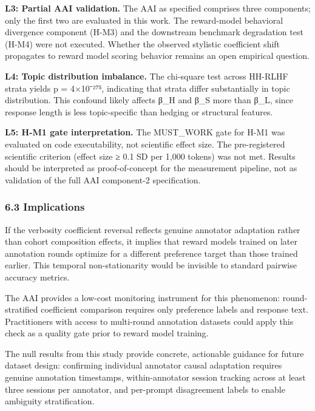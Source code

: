\textbf{L3: Partial AAI validation.} The AAI as specified comprises three components; only the first two are evaluated in this work. The reward-model behavioral divergence component (H-M3) and the downstream benchmark degradation test (H-M4) were not executed. Whether the observed stylistic coefficient shift propagates to reward model scoring behavior remains an open empirical question.

\textbf{L4: Topic distribution imbalance.} The chi-square test across HH-RLHF strata yields p = 4×10⁻²⁷⁵, indicating that strata differ substantially in topic distribution. This confound likely affects β_H and β_S more than β_L, since response length is less topic-specific than hedging or structural features.

\textbf{L5: H-M1 gate interpretation.} The MUST_WORK gate for H-M1 was evaluated on code executability, not scientific effect size. The pre-registered scientific criterion (effect size ≥ 0.1 SD per 1,000 tokens) was not met. Results should be interpreted as proof-of-concept for the measurement pipeline, not as validation of the full AAI component-2 specification.

\subsubsection{6.3 Implications}

If the verbosity coefficient reversal reflects genuine annotator adaptation rather than cohort composition effects, it implies that reward models trained on later annotation rounds optimize for a different preference target than those trained earlier. This temporal non-stationarity would be invisible to standard pairwise accuracy metrics.

The AAI provides a low-cost monitoring instrument for this phenomenon: round-stratified coefficient comparison requires only preference labels and response text. Practitioners with access to multi-round annotation datasets could apply this check as a quality gate prior to reward model training.

The null results from this study provide concrete, actionable guidance for future dataset design: confirming individual annotator causal adaptation requires genuine annotation timestamps, within-annotator session tracking across at least three sessions per annotator, and per-prompt disagreement labels to enable ambiguity stratification.

